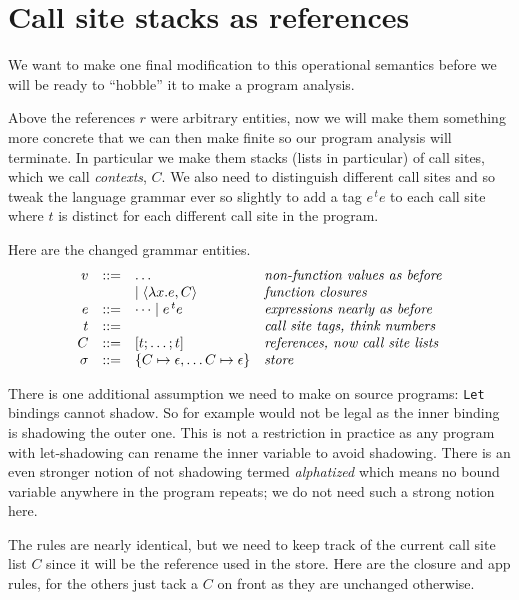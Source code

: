 \section{Call site stacks as references}

We want to make one final modification to this operational semantics before we will be ready to ``hobble'' it to make a program analysis.

Above the references $r$ were arbitrary entities, now we will make them something more concrete that we can then make finite so our program analysis will terminate.  In particular we make them stacks (lists in particular) of call sites, which we call \emph{contexts}, $C$.  We also need to distinguish different call sites and so tweak the language grammar ever so slightly to add a tag $e^{\, t}e$ to each call site where $t$ is distinct for each different call site in the program.

Here are the changed grammar entities.
$$
\begin{array}{rcll}
v &::=& \dots & \textit{non-function values as before}\\
  &   & \mid \lb \lambda x. e, C \rb  & \textit{function closures}\\
e &::=& \dots \mid e^{\, t}e& \textit{expressions nearly as before}\\
t &::=& & \textit{call site tags, think numbers}\\
C &::=& [t;\ldots;t] & \textit{references, now call site lists}\\
\store &::=& \{C \mapsto \env, \dots C \mapsto \env\} & \textit{store}
%
\end{array}
$$

There is one additional assumption we need to make on source programs: {\tt Let} bindings cannot shadow.  So for example  would not be legal as the inner  binding is shadowing the outer one.  This is not a restriction in practice as any program with let-shadowing can rename the inner variable to avoid shadowing.  There is an even stronger notion of not shadowing termed \emph{alphatized} which means no bound variable anywhere in the program repeats; we do not need such a strong notion here.

The rules are nearly identical, but we need to keep track of the current call site list $C$ since it will be the reference used in the store.  Here are the closure and app rules, for the others just tack a $C$ on front as they are unchanged otherwise.

